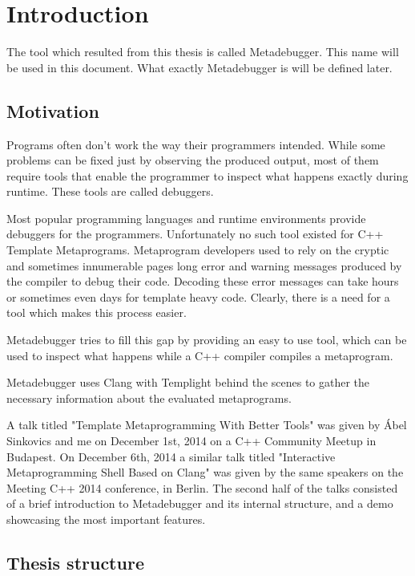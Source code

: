 
\chapter{Introduction} \label{introduction}

The tool which resulted from this thesis is called Metadebugger. This name will
be used in this document. What exactly Metadebugger is will be defined later.

\section{Motivation}

Programs often don't work the way their programmers intended. While some
problems can be fixed just by observing the produced output, most of them
require tools that enable the programmer to inspect what happens exactly
during runtime. These tools are called debuggers.

Most popular programming languages and runtime environments provide debuggers
for the programmers. Unfortunately no such tool existed for C++ Template
Metaprograms\cite{cpp14}. Metaprogram developers used to rely on the cryptic
and sometimes innumerable pages long error and warning messages produced by the
compiler to debug their code. Decoding these error messages can take hours or
sometimes even days for template heavy code\cite{sinkovics-phd,boost-spirit}.
Clearly, there is a need for a tool which makes this process easier.

Metadebugger tries to fill this gap by providing an easy to use tool, which can
be used to inspect what happens while a C++ compiler compiles a metaprogram.

Metadebugger uses Clang with Templight behind the scenes to gather the
necessary information about the evaluated metaprograms.

A talk titled "Template Metaprogramming With Better Tools" was given by Ábel
Sinkovics and me on December 1st, 2014 on a C++ Community
Meetup in Budapest\cite{cpp-meetup}. On December 6th, 2014 a similar talk
titled "Interactive Metaprogramming Shell Based on Clang" was given by the same
speakers on the Meeting C++ 2014 conference, in Berlin\cite{meeting-cpp}.
The second half of the talks consisted of a brief introduction to Metadebugger
and its internal structure, and a demo showcasing the most important features.

\section{Thesis structure}

